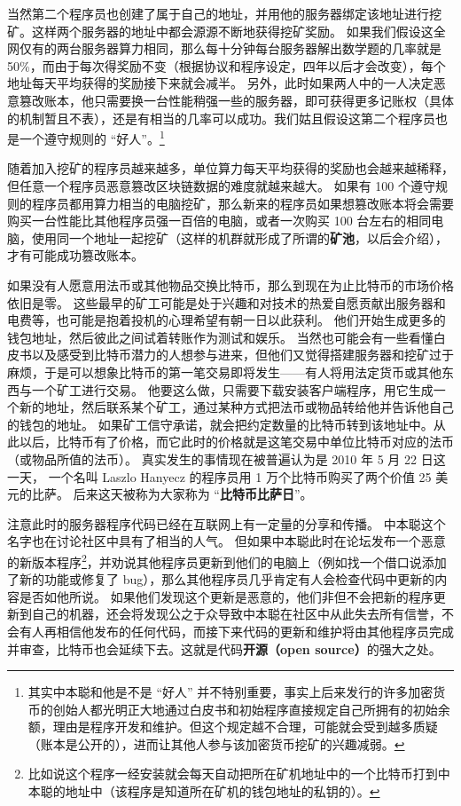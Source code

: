 当然第二个程序员也创建了属于自己的地址，并用他的服务器绑定该地址进行挖矿。这样两个服务器的地址中都会源源不断地获得挖矿奖励。 如果我们假设这全网仅有的两台服务器算力相同，那么每十分钟每台服务器解出数学题的几率就是 50\%，而由于每次得奖励不变（根据协议和程序设定，四年以后才会改变），每个地址每天平均获得的奖励接下来就会减半。 另外，此时如果两人中的一人决定恶意篡改账本，他只需要换一台性能稍强一些的服务器，即可获得更多记账权（具体的机制暂且不表），还是有相当的几率可以成功。我们姑且假设这第二个程序员也是一个遵守规则的 “好人”。\footnote{其实中本聪和他是不是 “好人” 并不特别重要，事实上后来发行的许多加密货币的创始人都光明正大地通过白皮书和初始程序直接规定自己所拥有的初始余额，理由是程序开发和维护。但这个规定越不合理，可能就会受到越多质疑（账本是公开的），进而让其他人参与该加密货币挖矿的兴趣减弱。}

随着加入挖矿的程序员越来越多，单位算力每天平均获得的奖励也会越来越稀释，但任意一个程序员恶意篡改区块链数据的难度就越来越大。 如果有 100 个遵守规则的程序员都用算力相当的电脑挖矿，那么新来的程序员如果想篡改账本将会需要购买一台性能比其他程序员强一百倍的电脑，或者一次购买 100 台左右的相同电脑，使用同一个地址一起挖矿（这样的机群就形成了所谓的\textbf{矿池}，以后会介绍），才有可能成功篡改账本。

如果没有人愿意用法币或其他物品交换比特币，那么到现在为止比特币的市场价格依旧是零。 这些最早的矿工可能是处于兴趣和对技术的热爱自愿贡献出服务器和电费等，也可能是抱着投机的心理希望有朝一日以此获利。 他们开始生成更多的钱包地址，然后彼此之间试着转账作为测试和娱乐。 当然也可能会有一些看懂白皮书以及感受到比特币潜力的人想参与进来，但他们又觉得搭建服务器和挖矿过于麻烦，于是可以想象比特币的第一笔交易即将发生——有人将用法定货币或其他东西与一个矿工进行交易。 他要这么做，只需要下载安装客户端程序，用它生成一个新的地址，然后联系某个矿工，通过某种方式把法币或物品转给他并告诉他自己的钱包的地址。 如果矿工信守承诺，就会把约定数量的比特币转到该地址中。从此以后，比特币有了价格，而它此时的价格就是这笔交易中单位比特币对应的法币（或物品所值的法币）。 真实发生的事情现在被普遍认为是 2010 年 5 月 22 日这一天， 一个名叫 Laszlo Hanyecz 的程序员用 1 万个比特币购买了两个价值 25 美元的比萨。 后来这天被称为大家称为 “\textbf{比特币比萨日}”。

注意此时的服务器程序代码已经在互联网上有一定量的分享和传播。 中本聪这个名字也在讨论社区中具有了相当的人气。 但如果中本聪此时在论坛发布一个恶意的新版本程序\footnote{比如说这个程序一经安装就会每天自动把所在矿机地址中的一个比特币打到中本聪的地址中（该程序是知道所在矿机的钱包地址的私钥的）。}，并劝说其他程序员更新到他们的电脑上（例如找一个借口说添加了新的功能或修复了 bug），那么其他程序员几乎肯定有人会检查代码中更新的内容是否如他所说。 如果他们发现这个更新是恶意的，他们非但不会把新的程序更新到自己的机器，还会将发现公之于众导致中本聪在社区中从此失去所有信誉，不会有人再相信他发布的任何代码，而接下来代码的更新和维护将由其他程序员完成并审查，比特币也会延续下去。这就是代码\textbf{开源（open source）}的强大之处。

